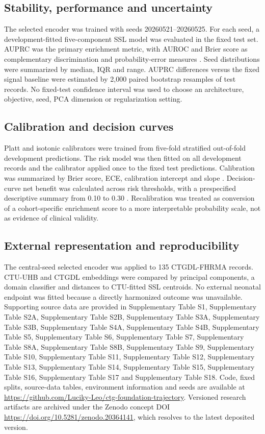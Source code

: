 \documentclass[utf8]{FrontiersinHarvard}
\begin{document}
\subsection{Stability, performance and uncertainty}

The selected encoder was trained with seeds 20260521--20260525. For each seed, a development-fitted five-component SSL model was evaluated in the fixed test set. AUPRC was the primary enrichment metric, with AUROC and Brier score as complementary discrimination and probability-error measures \citep{davis2006}. Seed distributions were summarized by median, IQR and range. AUPRC differences versus the fixed signal baseline were estimated by 2,000 paired bootstrap resamples of test records. No fixed-test confidence interval was used to choose an architecture, objective, seed, PCA dimension or regularization setting.

\subsection{Calibration and decision curves}

Platt and isotonic calibrators were trained from five-fold stratified out-of-fold development predictions. The risk model was then fitted on all development records and the calibrator applied once to the fixed test predictions. Calibration was summarized by Brier score, ECE, calibration intercept and slope \citep{vanCalster2019}. Decision-curve net benefit was calculated across risk thresholds, with a prespecified descriptive summary from 0.10 to 0.30 \citep{vickers2006}. Recalibration was treated as conversion of a cohort-specific enrichment score to a more interpretable probability scale, not as evidence of clinical validity.

\subsection{External representation and reproducibility}

The central-seed selected encoder was applied to 135 CTGDL-FHRMA records. CTU-UHB and CTGDL embeddings were compared by principal components, a domain classifier and distances to CTU-fitted SSL centroids. No external neonatal endpoint was fitted because a directly harmonized outcome was unavailable. Supporting source data are provided in Supplementary Table S1, Supplementary Table S2A, Supplementary Table S2B, Supplementary Table S3A, Supplementary Table S3B, Supplementary Table S4A, Supplementary Table S4B, Supplementary Table S5, Supplementary Table S6, Supplementary Table S7, Supplementary Table S8A, Supplementary Table S8B, Supplementary Table S9, Supplementary Table S10, Supplementary Table S11, Supplementary Table S12, Supplementary Table S13, Supplementary Table S14, Supplementary Table S15, Supplementary Table S16, Supplementary Table S17 and Supplementary Table S18. Code, fixed splits, source-data tables, environment information and seeds are available at \url{https://github.com/Luciky-Leo/ctg-foundation-trajectory}. Versioned research artifacts are archived under the Zenodo concept DOI \url{https://doi.org/10.5281/zenodo.20364141}, which resolves to the latest deposited version.
\end{document}
